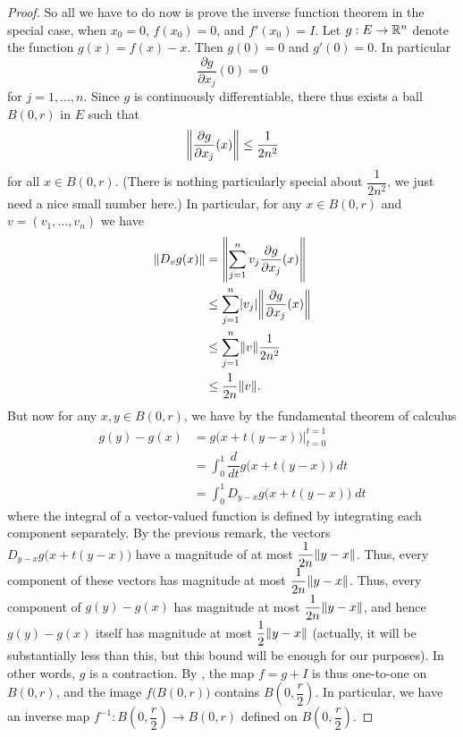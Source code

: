 \begin{proof}
  So all we have to do now is prove the inverse function theorem in the special case, when \(x_0 = 0\), \(f(x_0) = 0\), and \(f'(x_0) = I\).
  Let \(g : E \to \R^n\) denote the function \(g(x) = f(x) - x\).
  Then \(g(0) = 0\) and \(g'(0) = 0\).
  In particular
  \[
    \dfrac{\partial g}{\partial x_j}(0) = 0
  \]
  for \(j = 1, \dots, n\).
  Since \(g\) is continuously differentiable, there thus exists a ball \(B(0, r)\) in \(E\) such that
  \[
    \norm*{\dfrac{\partial g}{\partial x_j}(x)} \leq \dfrac{1}{2 n^2}
  \]
  for all \(x \in B(0, r)\).
  (There is nothing particularly special about \(\dfrac{1}{2 n^2}\), we just need a nice small number here.)
  In particular, for any \(x \in B(0, r)\) and \(v = (v_1, \dots, v_n)\) we have
  \begin{align*}
    \norm*{D_v g(x)} & = \norm*{\sum_{j = 1}^n v_j \dfrac{\partial g}{\partial x_j} (x)}         \\
                     & \leq \sum_{j = 1}^n \abs{v_j} \norm*{\dfrac{\partial g}{\partial x_j}(x)} \\
                     & \leq \sum_{j = 1}^n \norm*{v} \dfrac{1}{2 n^2}                            \\
                     & \leq \dfrac{1}{2n} \norm*{v}.
  \end{align*}
  But now for any \(x, y \in B(0, r)\), we have by the fundamental theorem of calculus
  \begin{align*}
    g(y) - g(x) & = g\big(x + t(y - x)\big) \big|_{t = 0}^{t = 1}        \\
                & = \int_0^1 \dfrac{d}{dt} g\big(x + t(y - x)\big) \; dt \\
                & = \int_0^1 D_{y - x} g\big(x + t(y - x)\big) \; dt
  \end{align*}
  where the integral of a vector-valued function is defined by integrating each component separately.
  By the previous remark, the vectors \(D_{y - x} g\big(x + t(y - x)\big)\) have a magnitude of at most \(\dfrac{1}{2n} \norm*{y - x}\).
  Thus, every component of these vectors has magnitude at most \(\dfrac{1}{2n} \norm*{y - x}\).
  Thus, every component of \(g(y) - g(x)\) has magnitude at most \(\dfrac{1}{2n} \norm*{y - x}\), and hence \(g(y) - g(x)\) itself has magnitude at most \(\dfrac{1}{2} \norm*{y - x}\)
  (actually, it will be substantially less than this, but this bound will be enough for our purposes).
  In other words, \(g\) is a contraction.
  By , the map \(f = g + I\) is thus one-to-one on \(B(0, r)\), and the image \(f\big(B(0, r)\big)\) contains \(B(0, \dfrac{r}{2})\).
  In particular, we have an inverse map \(f^{-1} : B(0, \dfrac{r}{2}) \to B(0, r)\) defined on \(B(0, \dfrac{r}{2})\).


\end{proof}
